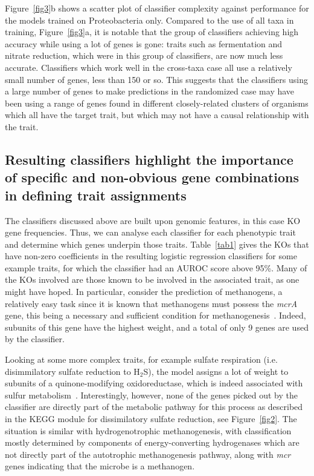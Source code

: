 \documentclass[10pt,letterpaper]{article}
\begin{document}
Figure~\ref{fig3}b shows a scatter plot of classifier complexity against performance for the models trained on Proteobacteria only. Compared to the use of all taxa in training, Figure~\ref{fig3}a, it is notable that the group of classifiers achieving high accuracy while using a lot of genes is gone: traits such as fermentation and nitrate reduction, which were in this group of classifiers, are now much less accurate. Classifiers which work well in the cross-taxa case all use a relatively small number of genes, less than 150 or so. This suggests that the classifiers using a large number of genes to make predictions in the randomized case may have been using a range of genes found in different closely-related clusters of organisms which all have the target trait, but which may not have a causal relationship with the trait.


\subsection*{Resulting classifiers highlight the importance of specific and non-obvious gene combinations in defining trait assignments}

The classifiers discussed above are built upon genomic features, in this case KO gene frequencies. Thus, we can analyse each classifier for each phenotypic trait and determine which genes underpin those traits. Table~\ref{tab1} gives the KOs that have non-zero coefficients in the resulting logistic regression classifiers for some example traits, for which the classifier had an AUROC score above 95\%. Many of the KOs involved are those known to be involved in the associated trait, as one might have hoped. In particular, consider the prediction of methanogens, a relatively easy task since it is known that methanogens must possess the \emph{mcrA} gene, this being a necessary and sufficient condition for methanogenesis~\cite{Deppenmeier2002}. Indeed, subunits of this gene have the highest weight, and a total of only 9 genes are used by the classifier. 

Looking at some more complex traits, for example sulfate respiration (i.e. disimmilatory sulfate reduction to H$_{2}$S), the model assigns a lot of weight to subunits of a quinone-modifying oxidoreductase, which is indeed associated with sulfur metabolism~\cite{Chan2009}. Interestingly, however, none of the genes picked out by the classifier are directly part of the metabolic pathway for this process as described in the KEGG module for dissimilatory sulfate reduction, see Figure~\ref{fig2}. The situation is similar with hydrogenotrophic methanogenesis, with classification mostly determined by components of energy-converting hydrogenases which are not directly part of the autotrophic methanogenesis pathway, along with \emph{mcr} genes indicating that the microbe is a methanogen.  
\end{document}
